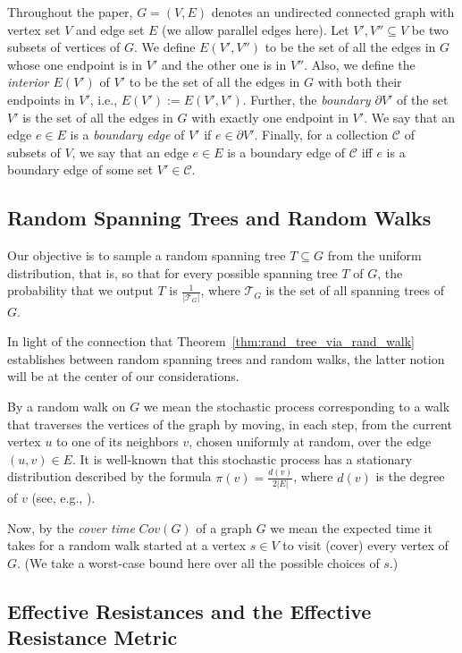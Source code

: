 \documentclass[11pt, letterpaper]{article}
\newcommand{\cC}{\mathcal{C}}
\newcommand{\cT}{\mathcal{T}}
\begin{document}
Throughout the paper, $G = (V,E)$ denotes an undirected connected graph with vertex set $V$ and edge set $E$ (we allow parallel edges here). Let $V', V''\subseteq V$ be two subsets of vertices of $G$. We define $E(V',V'')$ to be the set of all the edges in $G$ whose one endpoint is in $V'$ and the other one is in $V''$. Also, we define the {\em interior $E(V')$} of $V'$ to be the set of all the edges in $G$ with both their endpoints in $V'$, i.e., $E(V'):=E(V',V')$. Further, the {\em boundary $\partial V'$} of the set $V'$ is the set of all the edges in $G$ with exactly one endpoint in $V'$. We say that an edge $e\in E$ is a {\em boundary edge} of $V'$ if $e\in \partial V'$. Finally, for a collection $\cC$ of subsets of $V$, we say that an edge $e \in E$ is a boundary edge of $\cC$ iff $e$ is a boundary edge of some set $V' \in \cC$.

\subsection{Random Spanning Trees and Random Walks}

Our objective is to sample a random spanning tree $T \subseteq G$ from the uniform distribution, that is, so that for every possible spanning tree $T$ of $G$, the probability that we output $T$ is $\frac{1}{|\cT_G|}$, where $\cT_G$ is the set of all spanning trees of $G$.

In light of the connection that Theorem~\ref{thm:rand_tree_via_rand_walk} establishes between random spanning trees and random walks, the latter notion will be at the center of our considerations.

By a random walk on $G$ we mean the stochastic process corresponding to a walk that traverses the vertices of the graph by moving, in each step, from the current vertex $u$ to one of its neighbors $v$, chosen uniformly at random, over the edge $(u,v) \in E$. It is well-known that this stochastic process has a stationary distribution described by the formula $\pi(v)=\frac{d(v)}{2|E|}$, where $d(v)$ is the degree of $v$ (see, e.g., \cite{Lovasz93}).

Now, by the {\em cover time} $Cov(G)$ of a graph $G$ we mean the expected time it takes for a random walk started at a vertex $s \in V$ to visit (cover) every vertex of $G$. (We take a worst-case bound here over all the possible choices of $s$.)

\subsection{Effective Resistances and the Effective Resistance Metric}
\label{sec:effective_resistance}
\end{document}
